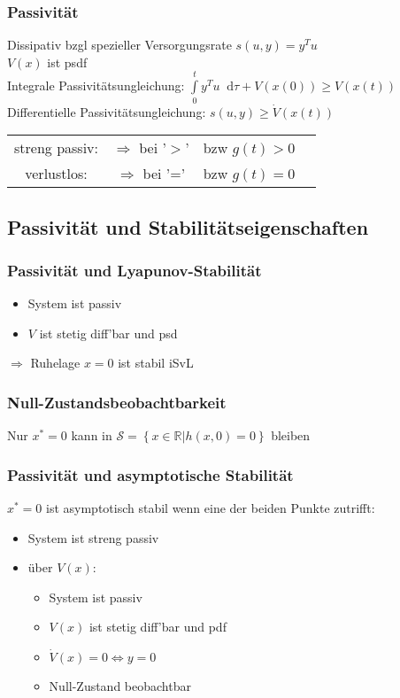 \documentclass[6pt,a4paper,fleqn]{scrartcl}
\newcommand*\diff{\mathop{}\!\mathrm{d}}
\begin{document}
\begin{multicols*}{4}
\subsubsection*{Passivität}
Dissipativ bzgl spezieller Versorgungsrate $s(u,y) = y^T u$ \\
$V(x)$ ist psdf \\
Integrale Passivitätsungleichung: $\int\limits_{0}^{t} y^T u \diff \tau + V(x(0)) \geq V(x(t))$ \\
Differentielle Passivitätsungleichung: $s(u,y) \geq \dot{V}(x(t))$ \\
\begin{tabular}{cccc}
  streng passiv: &  $\Rightarrow$ bei '$>$' & bzw $g(t) > 0$ \\
  verlustlos:    &  $\Rightarrow$ bei '=' & bzw $g(t) = 0$
\end{tabular}

\subsection{Passivität und Stabilitätseigenschaften}

\subsubsection*{Passivität und Lyapunov-Stabilität}
\begin{itemize}
  \item System ist passiv
  \item $V$ ist stetig diff'bar und psd
\end{itemize}
$\Rightarrow$ Ruhelage $x=0$ ist stabil iSvL

\subsubsection*{Null-Zustandsbeobachtbarkeit}
Nur $x^*=0$ kann in $\mathcal{S} = \left\{ x \in \mathbb{R} | h(x,0)=0 \right\}$ bleiben

\subsubsection*{Passivität und asymptotische Stabilität}
$x^*=0$ ist asymptotisch stabil wenn eine der beiden Punkte zutrifft: \\
\begin{itemize}
  \item System ist streng passiv
  \item über $V(x)$:
    \begin{itemize}
      \item System ist passiv
      \item $V(x)$ ist stetig diff'bar und pdf
      \item $\dot{V}(x) = 0 \Leftrightarrow y = 0$
      \item Null-Zustand beobachtbar
    \end{itemize}
\end{itemize}


\end{multicols*}
\end{document}
